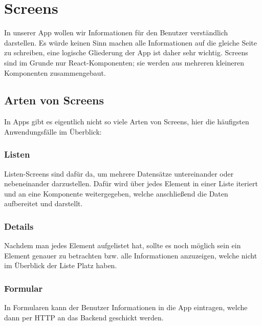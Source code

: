 \chapter{Screens}
In unserer App wollen wir Informationen für den Benutzer verständlich darstellen. Es würde keinen
Sinn machen alle Informationen auf die gleiche Seite zu schreiben, eine logische Gliederung der App
ist daher sehr wichtig. Screens sind im Grunde nur React-Komponenten; sie werden aus mehreren
kleineren Komponenten zusammengebaut.

\section{Arten von Screens}
In Apps gibt es eigentlich nicht so viele Arten von Screens, hier die häufigsten Anwendungsfälle im
Überblick:

\subsection{Listen}
Listen-Screens sind dafür da, um mehrere Datensätze untereinander oder nebeneinander darzustellen.
Dafür wird über jedes Element in einer Liste iteriert und an eine Komponente weitergegeben, welche
anschließend die Daten aufbereitet und darstellt.

\subsection{Details}
Nachdem man jedes Element aufgelistet hat, sollte es noch möglich sein ein Element genauer zu
betrachten bzw. alle Informationen anzuzeigen, welche nicht im Überblick der Liste Platz haben.

\subsection{Formular}
In Formularen kann der Benutzer Informationen in die App eintragen, welche dann per HTTP an das
Backend geschickt werden.




